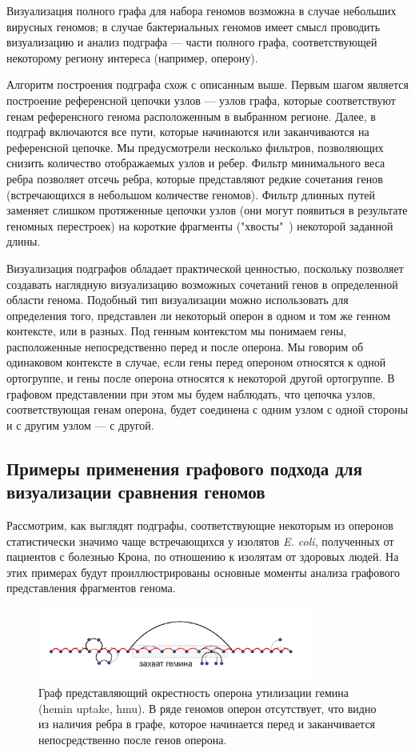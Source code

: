 Визуализация полного графа для набора геномов возможна в случае небольших вирусных геномов; в случае бактериальных геномов имеет смысл проводить визуализацию и анализ подграфа --- части полного графа, соответствующей некоторому региону интереса (например, оперону).

Алгоритм построения подграфа схож с описанным выше. Первым шагом является построение референсной цепочки узлов --- узлов графа, которые соответствуют генам референсного генома расположенным в выбранном регионе. Далее, в подграф включаются все пути, которые начинаются или заканчиваются на референсной цепочке. Мы предусмотрели несколько фильтров, позволяющих снизить количество отображаемых узлов и ребер. Фильтр минимального веса ребра позволяет отсечь ребра, которые представляют редкие сочетания генов (встречающихся в небольшом количестве геномов). Фильтр длинных путей заменяет слишком протяженные цепочки узлов (они могут появиться в результате геномных перестроек) на короткие фрагменты ("хвосты"\ ) некоторой заданной длины. 

Визуализация подграфов обладает практической ценностью, поскольку позволяет создавать наглядную визуализацию возможных сочетаний генов в определенной области генома. Подобный тип визуализации можно использовать для определения того, представлен ли некоторый оперон в одном и том же генном контексте, или в разных. Под генным контекстом мы понимаем гены, расположенные непосредственно перед и после оперона. Мы говорим об одинаковом контексте в случае, если гены перед опероном относятся к одной ортогруппе, и гены после оперона относятся к некоторой другой ортогруппе. В графовом представлении при этом мы будем наблюдать, что цепочка узлов, соответствующая генам оперона, будет соединена с одним узлом с одной стороны и с другим узлом --- с другой. 


\subsection*{Примеры применения графового подхода для визуализации сравнения геномов}

Рассмотрим, как выглядят подграфы, соответствующие некоторым из оперонов статистически значимо чаще встречающихся у изолятов \textit{E. coli}, полученных от пациентов с болезнью Крона, по отношению к изолятам от здоровых людей. На этих примерах будут проиллюстрированы основные моменты анализа графового представления фрагментов генома. 


\begin{figure}[!ht] 
  \center
  \includegraphics[width=0.8\textwidth]{Dissertation/images/subgraphs/hemin.png}
  \caption{Граф представляющий окрестность оперона утилизации гемина (hemin uptake, hmu). В ряде геномов оперон отсутствует, что видно из наличия ребра в графе, которое начинается перед и заканчивается непосредственно после генов оперона. }
  \label{img:sub_hem} 
\end{figure}

